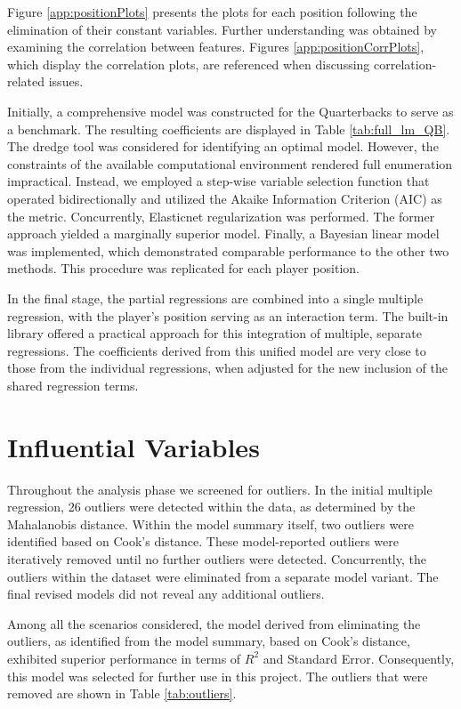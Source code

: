 Figure \ref{app:positionPlots} presents the plots for each position following the elimination of their constant variables. Further understanding was obtained by examining the correlation between features. Figures \ref{app:positionCorrPlots}, which display the correlation plots, are referenced when discussing correlation-related issues.

Initially, a comprehensive model was constructed for the Quarterbacks to serve as a benchmark. The resulting coefficients are displayed in Table \ref{tab:full_lm_QB}. 
The dredge tool was considered for identifying an optimal model. However, the constraints of the available computational environment rendered full enumeration impractical.
Instead, we employed a step-wise variable selection function that operated bidirectionally and 
utilized the Akaike Information Criterion (AIC) \cite{akaike1998} as the metric. 
Concurrently, Elasticnet regularization was performed. 
The former approach yielded a marginally superior model.
Finally, a Bayesian linear model was implemented, which demonstrated comparable performance to the other two methods.
This procedure was replicated for each player position.

In the final stage, the partial regressions are combined into a single multiple regression, 
with the player's position serving as an interaction term. 
The built-in library offered a practical approach for this integration of multiple, separate regressions. 
The coefficients derived from this unified model are very close to those from the individual regressions, 
when adjusted for the new inclusion of the shared regression terms.

\section{Influential Variables}

Throughout the analysis phase we screened for outliers. 
In the initial multiple regression, 26 outliers were detected within the data, as determined by the Mahalanobis distance. 
Within the model summary itself, two outliers were identified based on Cook's distance. 
These model-reported outliers were iteratively removed until no further outliers were detected. 
Concurrently, the outliers within the dataset were eliminated from a separate model variant. 
The final revised models did not reveal any additional outliers.

Among all the scenarios considered, the model derived from eliminating the outliers, 
as identified from the model summary, based on Cook's distance, 
exhibited superior performance in terms of $R^2$ and Standard Error. 
Consequently, this model was selected for further use in this project.
The outliers that were removed are shown in Table \ref{tab:outliers}.

